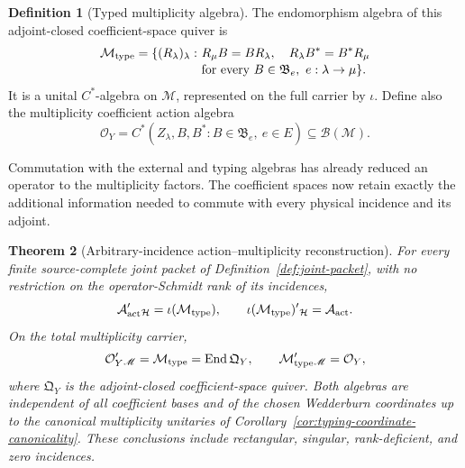 \documentclass[11pt]{article}
\numberwithin{equation}{section}
\newtheorem{theorem}{Theorem}[section]
\theoremstyle{definition}
\newtheorem{definition}[theorem]{Definition}
\theoremstyle{remark}
\newcommand{\End}{\operatorname{End}}
\newcommand{\A}{\mathcal A}
\newcommand{\Hh}{\mathcal H}
\newcommand{\M}{\mathcal M}
\newcommand{\Oalg}{\mathcal O}
\begin{document}
\begin{definition}[Typed multiplicity algebra]
\label{def:typed-multiplicity}
The endomorphism algebra of this adjoint-closed coefficient-space quiver is
\begin{equation}
 \begin{aligned}
 \M_{\rm type}=\{(R_\lambda)_\lambda:\ &R_\mu B=BR_\lambda,\quad
 R_\lambda B^*=B^*R_\mu\\[-.2em]
 &\text{for every }B\in\mathfrak B_e,
                   \ e:\lambda\to\mu\}.
 \end{aligned}
 \label{eq:typed-multiplicity}
\end{equation}
It is a unital $C^*$-algebra on $\mathscr M$, represented on the full carrier
by $\iota$.  Define also the multiplicity coefficient action algebra
\begin{equation}
 \Oalg_Y=C^*(Z_\lambda,B,B^*:B\in\mathfrak B_e,\ e\in E)
 \subseteq\mathcal B(\mathscr M).
 \label{eq:coefficient-action-algebra}
\end{equation}
\end{definition}

Commutation with the external and typing algebras has already reduced an
operator to the multiplicity factors.  The coefficient spaces now retain
exactly the additional information needed to commute with every physical
incidence and its adjoint.

\begin{theorem}[Arbitrary-incidence action--multiplicity reconstruction]
\label{thm:main-duality}
For every finite source-complete joint packet of
Definition~\ref{def:joint-packet}, with no restriction on the
operator-Schmidt rank of its incidences,
\begin{equation}
 \A_{\rm act}'{}_{\Hh}=\iota(\M_{\rm type}),\qquad
 \iota(\M_{\rm type})'{}_{\Hh}=\A_{\rm act}.
 \label{eq:main-duality}
\end{equation}
On the total multiplicity carrier,
\begin{equation}
 \Oalg_Y'{}_{\mathscr M}=\M_{\rm type}
   =\End\mathfrak Q_Y,\qquad
 \M_{\rm type}'{}_{\mathscr M}=\Oalg_Y,
 \label{eq:coefficient-quiver-duality}
\end{equation}
where $\mathfrak Q_Y$ is the adjoint-closed coefficient-space quiver.
Both algebras are independent of all coefficient bases and of the chosen
Wedderburn coordinates up to the canonical multiplicity unitaries of
Corollary~\ref{cor:typing-coordinate-canonicality}.  These conclusions include
rectangular, singular, rank-deficient, and zero incidences.

\end{theorem}
\end{document}
